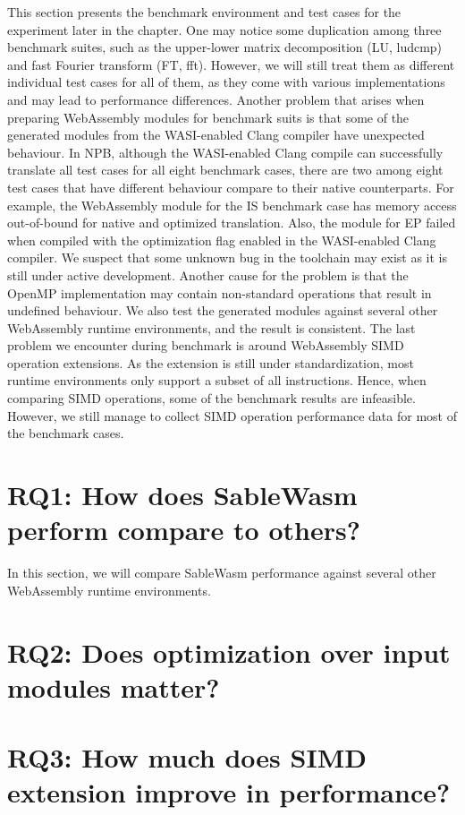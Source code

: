 This section presents the benchmark environment and test cases for the experiment later in the chapter. One may notice some duplication among three benchmark suites, such as the upper-lower matrix decomposition (LU, ludcmp) and fast Fourier transform (FT, fft). However, we will still treat them as different individual test cases for all of them, as they come with various implementations and may lead to performance differences. Another problem that arises when preparing WebAssembly modules for benchmark suits is that some of the generated modules from the WASI-enabled Clang compiler have unexpected behaviour. In NPB, although the WASI-enabled Clang compile can successfully translate all test cases for all eight benchmark cases, there are two among eight test cases that have different behaviour compare to their native counterparts. For example, the WebAssembly module for the IS benchmark case has memory access out-of-bound for native and optimized translation. Also, the module for EP failed when compiled with the optimization flag enabled in the WASI-enabled Clang compiler. We suspect that some unknown bug in the toolchain may exist as it is still under active development. Another cause for the problem is that the OpenMP implementation may contain non-standard operations that result in undefined behaviour. We also test the generated modules against several other WebAssembly runtime environments, and the result is consistent. The last problem we encounter during benchmark is around WebAssembly SIMD operation extensions. As the extension is still under standardization, most runtime environments only support a subset of all instructions. Hence, when comparing SIMD operations, some of the benchmark results are infeasible. However, we still manage to collect SIMD operation performance data for most of the benchmark cases.

\section[RQ1: How does SableWasm perform compare to others?]{{\large RQ1: How does SableWasm perform compare to others?}}

In this section, we will compare SableWasm performance against several other WebAssembly runtime environments.

\section[RQ2: Does optimization over input modules matter?]{
  {\large RQ2: Does optimization over input modules matter?}}

\section[RQ3: How much does SIMD extension improve in performance?]{
  {\large RQ3: How much does SIMD extension improve in performance?}}